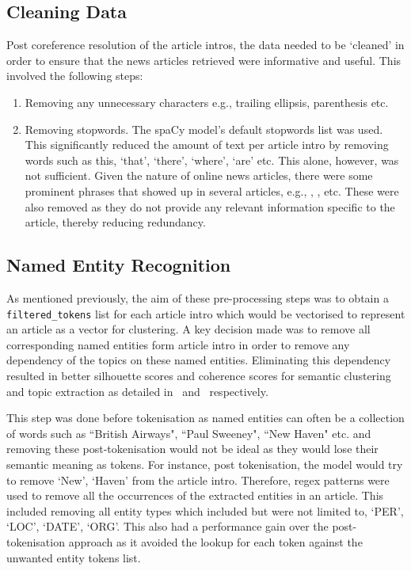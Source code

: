 \subsection*{Cleaning Data} \label{data_cleaning}
Post coreference resolution of the article intros, the data needed to be `cleaned' in order to ensure that the news articles retrieved were informative and useful. This involved the following steps: 
\begin{enumerate}
    \item Removing any unnecessary characters e.g., trailing ellipsis, parenthesis etc.
    \item Removing stopwords. The spaCy model's default stopwords list was used. This significantly reduced the amount of text per article intro by removing words such as this, `that', `there', `where', `are' etc. This alone, however, was not sufficient. Given the nature of online news articles, there were some prominent phrases that showed up in several articles, e.g., , ,  etc. These were also removed as they do not provide any relevant information specific to the article, thereby reducing redundancy.

\end{enumerate}

\subsection*{Named Entity Recognition}
As mentioned previously, the aim of these pre-processing steps was to obtain a \texttt{filtered\_tokens} list for each article intro which would be vectorised to represent an article as a vector for clustering. A key decision made was to remove all corresponding named entities form article intro in order to remove any dependency of the topics on these named entities. Eliminating this dependency resulted in better silhouette scores and coherence scores for semantic clustering and topic extraction as detailed in~ and~ respectively. 

This step was done before tokenisation as named entities can often be a collection of words such as ``British Airways", ``Paul Sweeney", ``New Haven" etc. and removing these post-tokenisation would not be ideal as they would lose their semantic meaning as tokens. For instance, post tokenisation, the model would try to remove `New', `Haven' from the article intro. Therefore, regex patterns were used to remove all the occurrences of the extracted entities in an article. This included removing all entity types which included but were not limited to, `PER', `LOC', `DATE', `ORG'. This also had a performance gain over the post-tokenisation approach as it avoided the lookup for each token against the unwanted entity tokens list.

